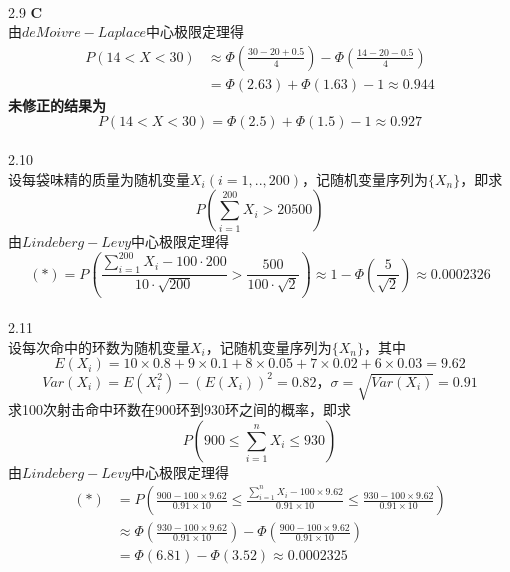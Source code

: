 \documentclass[a4paper]{ctexart}    %
\begin{document}
	\\
	2.9 \quad\textbf{C} \\
	由$deMoivre-Laplace$中心极限定理得
	\begin{equation*}
		\begin{split}
			P(14 < X < 30) &\approx \Phi\left(\frac{30-20+0.5}{4}\right)-\Phi\left(\frac{14-20-0.5}{4}\right)\\
			&=\Phi(2.63)+\Phi(1.63)-1\approx 0.944
		\end{split}
	\end{equation*}
	\textbf{未修正的结果为}
	\[P(14 < X < 30)=\Phi(2.5)+\Phi(1.5)-1\approx 0.927\] \\
	2.10 \\
	设每袋味精的质量为随机变量$X_i(i=1,..,200)$，记随机变量序列为$\{X_n\}$，即求
	\begin{equation*}
		P\left(\sum\limits_{i=1}^{200}X_i > 20500\right)\tag{$*$}
	\end{equation*}
	由$Lindeberg-Levy$中心极限定理得
	\[(*) = P\left(\frac{\sum\limits_{i=1}^{200}X_i-100\cdot 200}{10\cdot \sqrt{200}} > \frac{500}{100\cdot \sqrt{2}}\right)\approx 1-\Phi\left(\frac{5}{\sqrt{2}}\right)\approx 0.0002326\] \\
	2.11 \\
	设每次命中的环数为随机变量$X_i$，记随机变量序列为$\{X_n\}$，其中\\
	\[E(X_i)=10\times 0.8 + 9\times 0.1 + 8\times 0.05 + 7\times 0.02 + 6\times 0.03 = 9.62\]
	\[Var(X_i)=E(X_i^2)-(E(X_i))^2=0.82\text{，}\sigma=\sqrt{Var(X_i)}=0.91\]
	求100次射击命中环数在900环到930环之间的概率，即求
	\begin{equation*}
		P\left(900 \leq \sum\limits_{i=1}^{n}X_i \leq 930\right)\tag{$*$}
	\end{equation*}
	由$Lindeberg-Levy$中心极限定理得
	\begin{equation*}
		\begin{split}
			(*) &= P\left(\frac{900-100\times 9.62}{0.91 \times 10} \leq \frac{\sum\limits_{i=1}^{n}X_i-100\times 9.62}{0.91\times 10} \leq \frac{930-100\times 9.62}{0.91\times 10}\right)\\
			&\approx \Phi\left(\frac{930-100\times 9.62}{0.91\times 10}\right) - \Phi\left(\frac{900-100\times 9.62}{0.91 \times 10}\right)\\
			&= \Phi(6.81)-\Phi(3.52)\approx 0.0002325
		\end{split}
	\end{equation*}
\end{document}

